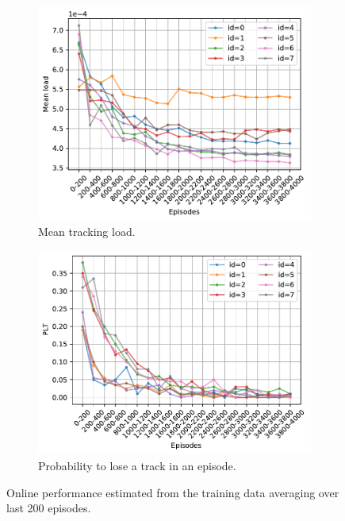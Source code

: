 \documentclass[english, 12pt, a4paper, elec, utf8, a-1b, online]{aaltothesis}
\begin{document}
\begin{figure}[htb]
    \centering
    \begin{subfigure}[b]{0.7\textwidth}
        \includegraphics[width=\textwidth]{figures/benchmark/Training/online_load.pdf}
        \caption{Mean tracking load.}
        \label{fig:online_load}
    \end{subfigure}
    \hfill
    \begin{subfigure}[b]{0.7\textwidth}
        \includegraphics[width=\textwidth]{figures/benchmark/Training/online_plt.pdf}
        \caption{Probability to lose a track in an episode.}
        \label{fig:online_lost}
    \end{subfigure}
    \caption{Online performance estimated from the training data averaging over last 200 episodes.}
    \label{fig:online_performance}
\end{figure}
\end{document}
